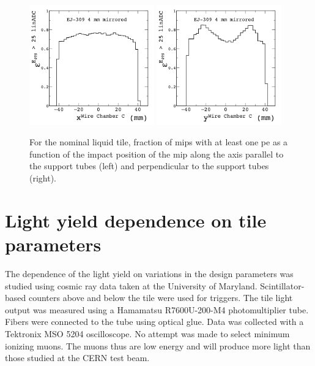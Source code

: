 \documentclass[review]{elsarticle}
\begin{document}
\begin{figure}[h]
\centering\includegraphics[width=0.48\textwidth]{./figures/fiducial2.png}
\centering\includegraphics[width=0.48\textwidth]{./figures/fiducial3.png}
\caption{For the nominal liquid tile, fraction of mips with at least
  one pe as a function of the impact position of the mip along the
  axis parallel to the support tubes (left) and perpendicular to the
  support tubes (right).
}
\label{fig:fiducial}
\end{figure}

\section{Light yield dependence on tile parameters}

The dependence of the light yield on variations in the design
parameters was studied using cosmic ray data taken at the University
of Maryland. Scintillator-based counters above and below the tile
were used for triggers. The tile light output was measured using a
Hamamatsu R7600U-200-M4 photomultiplier tube. Fibers were connected
to the tube using optical glue. Data was collected with a Tektronix
MSO 5204 oscilloscope. No attempt was made to select minimum ionizing
muons. The muons thus are low energy and will produce more light than
those studied at the CERN test beam.
\end{document}
